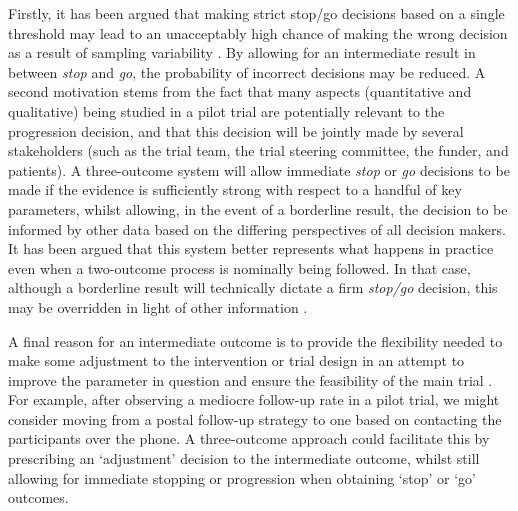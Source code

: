 \documentclass[referee, lineno, pdflatex,sn-vancouver,Numbered]{sn-jnl}%
\theoremstyle{thmstyleone}%
\theoremstyle{thmstyletwo}%
\theoremstyle{thmstylethree}%
\begin{document}
Firstly, it has been argued that making strict stop/go decisions based on a single threshold  may lead to an unacceptably high chance of making the wrong decision as a result of sampling variability %
\cite{Eldridge2016a}. By allowing for an intermediate result in between \emph{stop} and \emph{go}, the probability of incorrect decisions may be reduced. A second motivation stems from the fact that many aspects (quantitative and qualitative) being studied in a pilot trial are potentially relevant to the progression decision, and that this decision will be jointly made by several stakeholders (such as the trial team, the trial steering committee, the funder, and patients). A three-outcome system will allow immediate \emph{stop} or \emph{go} decisions to be made if the evidence is sufficiently strong with respect to a handful of key parameters, whilst allowing, in the event of a borderline result, the decision to be informed by other data based on the differing perspectives of all decision makers. It has been argued that this system better represents what happens in practice even when a two-outcome process is nominally being followed. In that case, although a borderline result will technically dictate a firm \emph{stop/go} decision, this may be overridden in light of other information \cite{Sargent2001}.

A final reason for an intermediate outcome is to provide the flexibility needed to make some adjustment to the intervention or trial design in an attempt to improve the parameter in question and ensure the feasibility of the main trial%
. For example, after observing a mediocre follow-up rate in a pilot trial, we might consider moving from a postal follow-up strategy to one based on contacting the participants over the phone. A three-outcome approach could facilitate this by prescribing an `adjustment' decision to the intermediate outcome, whilst still allowing for immediate stopping or progression when obtaining `stop' or `go' outcomes. 
\end{document}
